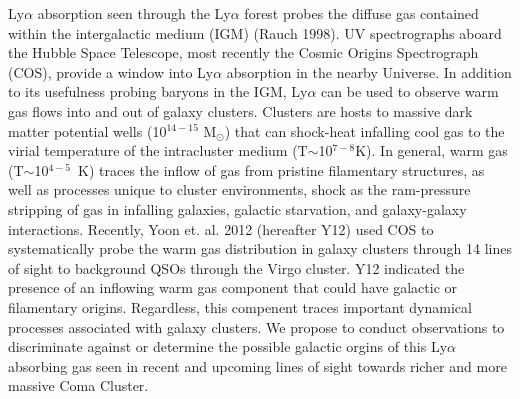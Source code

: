 \justification
Ly$\alpha$ absorption seen through the Ly$\alpha$ forest probes the diffuse gas
contained within the intergalactic medium (IGM) (Rauch 1998). UV spectrographs
aboard the Hubble Space Telescope, most recently the 
Cosmic Origins Spectrograph (COS), provide a window into Ly$\alpha$ absorption 
in the nearby Universe. In addition to its usefulness probing baryons in the
IGM, Ly$\alpha$ can be used to observe warm gas flows into and out of 
galaxy clusters. Clusters are hosts to massive dark matter potential wells
(10$^{14-15}$ M$_{\odot}$) that can shock-heat infalling cool gas to the virial
temperature of the intracluster medium (T$\sim$10$^{7-8}$K). In general, warm
gas (T$\sim$10$^{4-5}$~K) traces the inflow of gas from pristine filamentary
structures, as well as processes unique to cluster environments, shock as the
ram-pressure stripping of gas in infalling galaxies, galactic starvation, 
and galaxy-galaxy interactions. Recently, Yoon et. al. 2012 (hereafter Y12) used
COS to systematically probe the warm gas distribution in
galaxy clusters through 14 lines of sight to background QSOs through the Virgo
cluster. Y12 indicated the presence of an inflowing warm gas component that could
have galactic or filamentary origins. Regardless, this compenent traces important dynamical
processes associated with galaxy clusters. We propose to conduct observations
to discriminate against or determine the possible galactic orgins of this Ly$\alpha$
absorbing gas seen in recent and upcoming lines of sight towards
richer and more massive Coma Cluster.

